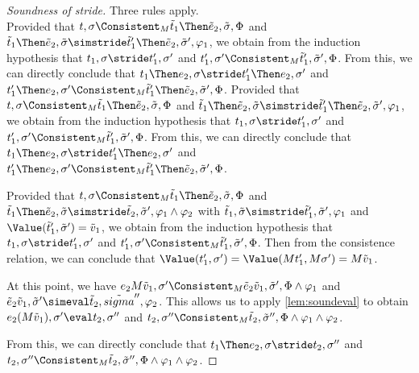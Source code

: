 \begin{proof}[Soundness of stride]
 {
Three rules apply.\\
   {
     Provided that $t,\sigma\Consistent_M\tilde{t}_1\Then \tilde{e}_2,\tilde{\sigma},\Phi$
     and $\tilde{t}_1\Then \tilde{e}_2,\tilde{\sigma}\simstride\tilde{t}'_1\Then \tilde{e}_2,\tilde{\sigma}',\phi_1$,
     we obtain from the induction hypothesis that $t_1,\sigma\stride t_1',\sigma'$ and $t_1',\sigma'\Consistent_M\tilde{t}_1',\tilde{\sigma}',\Phi$.
     From this, we can directly conclude that $t_1\Then e_2,\sigma\stride t_1'\Then e_2,\sigma'$ and $t_1'\Then e_2,\sigma'\Consistent_M\tilde{t}_1'\Then\tilde{e}_2,\tilde{\sigma}',\Phi$.
  }
   { Provided that $t,\sigma\Consistent_M\tilde{t}_1\Then \tilde{e}_2,\tilde{\sigma},\Phi$
   and $\tilde{t}_1\Then \tilde{e}_2,\tilde{\sigma}\simstride\tilde{t}'_1\Then \tilde{e}_2,\tilde{\sigma}',\phi_1$,
   we obtain from the induction hypothesis that $t_1,\sigma\stride t_1',\sigma'$ and $t_1',\sigma'\Consistent_M\tilde{t}_1',\tilde{\sigma}',\Phi$.
   From this, we can directly conclude that $t_1\Then e_2,\sigma\stride t_1'\Then e_2,\sigma'$ and $t_1'\Then e_2,\sigma'\Consistent_M\tilde{t}_1'\Then\tilde{e}_2,\tilde{\sigma}',\Phi$.
   }
   {Provided that $t,\sigma\Consistent_M\tilde{t}_1\Then \tilde{e}_2,\tilde{\sigma},\Phi$
   and $\tilde{t}_1\Then \tilde{e}_2,\tilde{\sigma}\simstride\tilde{t}_2,\tilde{\sigma}',\phi_1\land\phi_2$
   with $\tilde{t}_1,\tilde{\sigma}\simstride\tilde{t}_1',\tilde{\sigma}',\phi_1$ and $\Value(\tilde{t}_1',\tilde{\sigma}')=\tilde{v}_1$,
   we obtain from the induction hypothesis that $t_1,\sigma\stride t_1',\sigma'$ and $t_1',\sigma'\Consistent_M\tilde{t}_1',\tilde{\sigma}',\Phi$.
   Then from the consistence relation, we can conclude that $\Value(t_1',\sigma')=\Value(M t_1',M \sigma')=M\tilde{v}_1$.

   At this point, we have $e_2 M\tilde{v}_1,\sigma'\Consistent_M\tilde{e}_2 \tilde{v}_1,\tilde{\sigma}',\Phi\land\phi_1$ and $\tilde{e}_2 \tilde{v}_1,\tilde{\sigma}'\simeval\tilde{t}_2,\tilde{sigma}'',\phi_2$.
   This allows us to apply \cref{lem:soundeval} to obtain $e_2 (M\tilde{v}_1),\sigma'\eval t_2,\sigma''$ and $t_2,\sigma''\Consistent_M\tilde{t}_2,\tilde{\sigma}'',\Phi\land\phi_1\land\phi_2$.

   From this, we can directly conclude that $t_1\Then e_2,\sigma\stride t_2,\sigma''$ and $t_2,\sigma''\Consistent_M\tilde{t}_2,\tilde{\sigma}'',\Phi\land\phi_1\land\phi_2$.

}}
\end{proof}
